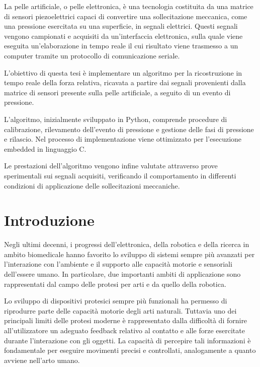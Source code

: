 \documentclass[10pt, a4paper]{article}
\begin{document}
    La pelle artificiale, o pelle elettronica, è una tecnologia costituita da una matrice di sensori piezoelettrici capaci di convertire una sollecitazione
    meccanica, come una pressione esercitata su una superficie, in segnali elettrici. Questi segnali vengono campionati e acquisiti da un'interfaccia elettronica,
    sulla quale viene eseguita un'elaborazione in tempo reale il cui risultato viene trasmesso a un computer tramite un protocollo di comunicazione seriale.

    L'obiettivo di questa tesi è implementare un algoritmo per la ricostruzione in tempo reale della forza relativa, ricavata a partire dai segnali 
    provenienti dalla matrice di sensori presente sulla pelle artificiale, a seguito di un evento di pressione. 

    L'algoritmo, inizialmente sviluppato in Python, comprende procedure di calibrazione, rilevamento dell'evento di pressione e gestione delle fasi di 
    pressione e rilascio. Nel processo di implementazione viene ottimizzato per l'esecuzione embedded in linguaggio C.
     
    Le prestazioni dell'algoritmo vengono infine valutate attraverso prove sperimentali sui segnali acquisiti, verificando il comportamento in 
    differenti condizioni di applicazione delle sollecitazioni meccaniche.
       
    
    \newpage
    \section{Introduzione}
        Negli ultimi decenni, i progressi dell'elettronica, della robotica e della ricerca in ambito biomedicale hanno favorito lo sviluppo di sistemi sempre più avanzati per l'interazione con l'ambiente
        e il supporto alle capacità motorie e sensoriali dell'essere umano. In particolare, due importanti ambiti di applicazione sono rappresentati dal campo delle protesi per arti e
        da quello della robotica.

        Lo sviluppo di dispositivi protesici sempre più funzionali ha permesso di riprodurre parte delle capacità motorie degli arti naturali. Tuttavia uno dei principali limiti delle protesi moderne
        è rappresentato dalla difficoltà di fornire all'utilizzatore un adeguato feedback relativo al contatto e alle forze esercitate durante l'interazione con gli oggetti. La capacità di
        percepire tali informazioni è fondamentale per eseguire movimenti precisi e controllati, analogamente a quanto avviene nell'arto umano.
\end{document}
